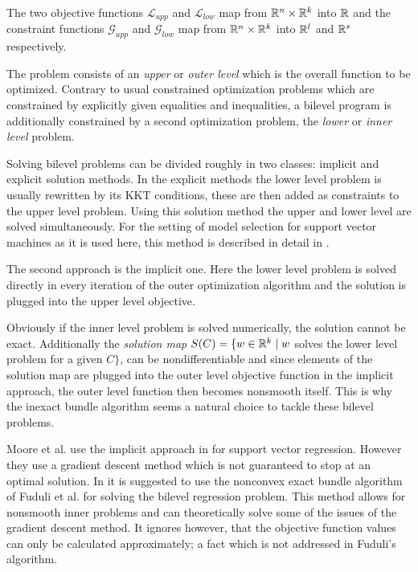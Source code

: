 The two objective functions \(\mathcal{L}_{upp}\) and \(\mathcal{L}_{low}\) map from \(\mathbb{R}^n\times\mathbb{R}^k\) into \(\mathbb{R}\) and the constraint functions \(\mathcal{G}_{upp}\) and \(\mathcal{G}_{low}\) map from \(\mathbb{R}^n\times\mathbb{R}^k\) into \(\mathbb{R}^l\) and \(\mathbb{R}^s\) respectively. 

The problem consists of an \emph{upper} or \emph{outer level} which is the overall function to be optimized. Contrary to usual constrained optimization problems which are constrained by explicitly given equalities and inequalities, a  bilevel program is additionally constrained by a second optimization problem, the \emph{lower} or \emph{inner level} problem.

Solving bilevel problems can be divided roughly in two classes: implicit and explicit solution methods. 
In the explicit methods the lower level problem is usually rewritten by its KKT conditions, these are then added as constraints to the upper level problem. Using this solution method the upper and lower level are solved simultaneously. For the setting of model selection for support vector machines as it is used here, this method is described in detail in \cite{Kunapuli2008}.

The second approach is the implicit one. Here the lower level problem is solved directly in every iteration of the outer optimization algorithm and the solution is plugged into the upper level objective. 

Obviously if the inner level problem is solved numerically, the solution cannot be exact. Additionally the \emph{solution map} \( S(C) = \{w\in \mathbb{R}^k \mid w\) solves the lower level problem for a given \(C\}\), can be nondifferentiable \cite{Outrata1998} and since elements of  the solution map are plugged into the outer level objective function in the implicit approach, the outer level function then becomes nonsmooth itself. This is why the inexact bundle algorithm seems a natural choice to tackle these bilevel problems. 

Moore et al. use the implicit approach in \cite{Moore2011} for support vector regression. However they use a gradient descent method which is not guaranteed to stop at an optimal solution.
In \cite{Moore2010a} it is suggested to use the nonconvex exact bundle algorithm of Fuduli et al. \cite{Fuduli2004a} for solving the bilevel regression problem. This method allows for nonsmooth inner problems and can theoretically solve some of the issues of the gradient descent method. It ignores however, that the objective function values can only be calculated approximately; a fact which is not addressed in Fuduli's algorithm.

